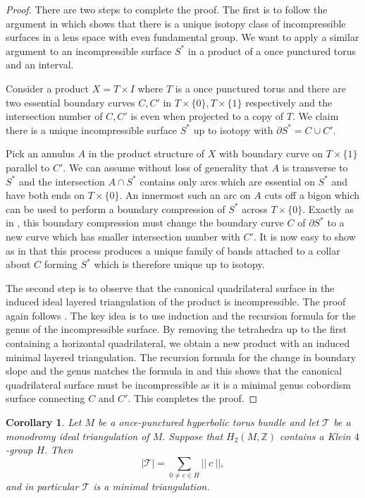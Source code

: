 \documentclass[a4paper]{gtart}
\def\tri{\mathcal{T}}
\def\manifold{M}
\def\Z{\mathbb{Z}}
\theoremstyle{plain}
\newtheorem{corollary}[theorem]{Corollary}
\theoremstyle{definition}
\theoremstyle{remark}
\numberwithin{equation}{section}
\begin{document}
\begin{proof}
There are two steps to complete the proof. The first is to follow the argument in \cite[Theorem 12]{Rubinstein-one-sided-1978} which shows that there is a unique isotopy class of incompressible surfaces in a lens space with even fundamental group. We want to apply a similar argument to an incompressible surface $S^*$ in a product of a once punctured torus and an interval. 

Consider a product $X= T \times I$ where $T$ is a once punctured torus and there are two essential boundary curves  $C, C'$ in $T \times \{0\}, T \times \{1\}$ respectively and the intersection number of $C,C'$ is even when projected to a copy of $T.$ We claim there is a unique incompressible surface $S^*$ up to isotopy with $\partial S^* = C \cup C'.$ 

Pick an annulus $A$ in the product structure of $X$ with boundary curve on  $T \times \{1\}$ parallel to $C'.$ We can assume without loss of generality that $A$ is transverse to $S^*$ and the intersection $A \cap S^*$ contains only arcs which are essential on $S^*$ and have both ends on $T \times \{0\}.$ An innermost such an arc on $A$ cuts off a bigon which can be used to perform a boundary compression of $S^*$ across $T \times \{0\}.$ Exactly as in \cite{Rubinstein-one-sided-1978}, this boundary compression must change the boundary curve $C$ of $\partial S^*$ to a new curve which has smaller intersection number with $C'.$ It is now easy to show as in \cite{Rubinstein-one-sided-1978} that this process produces a unique family of bands attached to a collar about $C$ forming $S^*$ which is therefore unique up to isotopy. 

The second step is to observe that the canonical quadrilateral surface in the induced ideal layered triangulation of the product is incompressible. The proof again follows \cite{Rubinstein-one-sided-1978}. The key idea is to use induction and the recursion formula for the genus of the incompressible surface. By removing the tetrahedra up to the first containing a horizontal quadrilateral, we obtain a new product with an induced minimal layered triangulation. The recursion formula for the change in boundary slope and the genus matches the formula in \cite{Rubinstein-one-sided-1978} and this shows that the canonical quadrilateral surface must be incompressible as it is a minimal genus cobordism surface connecting $C$ and $C'.$ This completes the proof. 
\end{proof}

\begin{corollary}
  \label{cor:rank2minimalbundle}
  Let $\manifold$ be a once-punctured hyperbolic torus bundle and let $\tri$ be a monodromy ideal triangulation of $\manifold.$ Suppose that $H_2 (\manifold , \Z)$ contains a Klein $4$-group $H.$ Then 
  $$ |\tri| = \sum \limits_{0 \neq c \in H} || \ c\ ||, $$
  and in particular $\tri$ is a minimal triangulation. 
\end{corollary}
\end{document}
